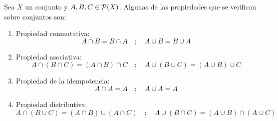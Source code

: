 \begin{prop}
    Sea $X$ un conjunto y $A, B, C \in \mathcal{P}(X)$. Algunas de las propiedades que se verifican sobre conjuntos son:
    \begin{enumerate}
        \item Propiedad conmutativa:
        $$A \cap B = B \cap A \quad;\quad A \cup B = B \cup A$$
        \item Propiedad asociativa:
        $$A \cap (B \cap C) = (A \cap B) \cap C \quad;\quad A \cup (B \cup C) = (A \cup B) \cup C$$
        \item Propiedad de la idempotencia:
        $$A \cap A = A \quad;\quad A \cup A = A$$
        \item Propiedad distributiva:
        $$A \cap (B \cup C) = (A \cap B) \cup (A \cap C) \quad;\quad A \cup (B \cap C) = (A \cup B) \cap (A \cup C)$$
    \end{enumerate}
\end{prop}
